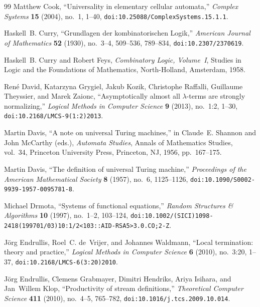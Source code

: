 \documentclass[11pt,reqno]{amsart}
\numberwithin{equation}{section}
\theoremstyle{plain}
\theoremstyle{definition}
\theoremstyle{remark}
\begin{document}
\begin{thebibliography}{99}
Matthew Cook,
``Universality in elementary cellular automata,''
\emph{Complex Systems} \textbf{15} (2004), no.~1, 1--40,
\texttt{doi:10.25088/ComplexSystems.15.1.1}.

Haskell~B. Curry,
``Grundlagen der kombinatorischen Logik,''
\emph{American Journal of Mathematics} \textbf{52} (1930), no.~3--4, 509--536, 789--834,
\texttt{doi:10.2307/2370619}.

Haskell~B. Curry and Robert Feys,
\emph{Combinatory Logic, Volume~I},
Studies in Logic and the Foundations of Mathematics, North-Holland, Amsterdam, 1958.

Ren{\'e} David, Katarzyna Grygiel, Jakub Kozik, Christophe Raffalli, Guillaume Theyssier, and Marek Zaionc,
``Asymptotically almost all $\lambda$-terms are strongly normalizing,''
\emph{Logical Methods in Computer Science} \textbf{9} (2013), no.~1:2, 1--30,
\texttt{doi:10.2168/LMCS-9(1:2)2013}.

Martin Davis,
``A note on universal Turing machines,''
in Claude~E. Shannon and John McCarthy (eds.), \emph{Automata Studies},
Annals of Mathematics Studies, vol.~34, Princeton University Press, Princeton, NJ, 1956, pp.~167--175.

Martin Davis,
``The definition of universal Turing machine,''
\emph{Proceedings of the American Mathematical Society} \textbf{8} (1957), no.~6, 1125--1126,
\texttt{doi:10.1090/S0002-9939-1957-0095781-8}.

Michael Drmota,
``Systems of functional equations,''
\emph{Random Structures \& Algorithms} \textbf{10} (1997), no.~1--2, 103--124,
\texttt{doi:10.1002/(SICI)1098-2418(199701/03)10:1/2<103::AID-RSA5>3.0.CO;2-Z}.

J{\"o}rg Endrullis, Roel~C. de~Vrijer, and Johannes Waldmann,
``Local termination: theory and practice,''
\emph{Logical Methods in Computer Science} \textbf{6} (2010), no.~3:20, 1--37,
\texttt{doi:10.2168/LMCS-6(3:20)2010}.

J{\"o}rg Endrullis, Clemens Grabmayer, Dimitri Hendriks, Ariya Isihara, and Jan~Willem Klop,
``Productivity of stream definitions,''
\emph{Theoretical Computer Science} \textbf{411} (2010), no.~4--5, 765--782,
\texttt{doi:10.1016/j.tcs.2009.10.014}.


\end{thebibliography}
\end{document}

